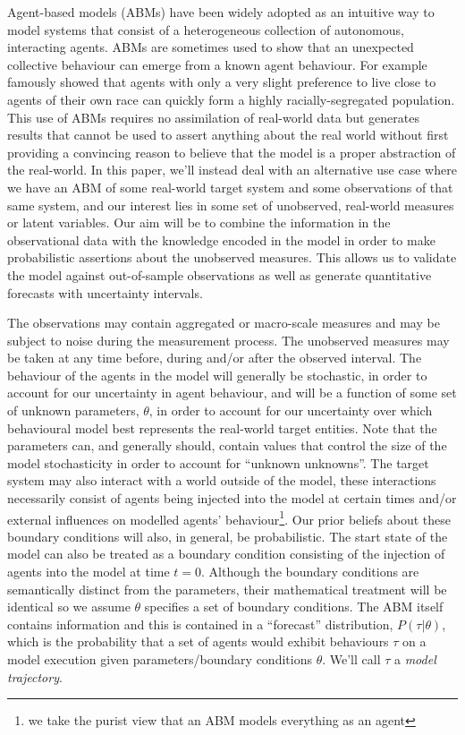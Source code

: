 \documentclass{article}
\begin{document}
Agent-based models (ABMs) have been widely adopted as an intuitive way to model systems that consist of a heterogeneous collection of autonomous, interacting agents. ABMs are sometimes used to show that an unexpected collective behaviour can emerge from a known agent behaviour.  For example \citet{schelling1971dynamic} famously showed that agents with only a very slight preference to live close to agents of their own race can quickly form a highly racially-segregated population. This use of ABMs requires no assimilation of real-world data but generates results that cannot be used to assert anything about the real world without first providing a convincing reason to believe that the model is a proper abstraction of the real-world. In this paper, we'll instead deal with an alternative use case where we have an ABM of some real-world target system and some observations of that same system, and our interest lies in some set of unobserved, real-world measures or latent variables. Our aim will be to combine the information in the observational data with the knowledge encoded in the model in order to make probabilistic assertions about the unobserved measures. This allows us to validate the model against out-of-sample observations as well as generate quantitative forecasts with uncertainty intervals.

The observations may contain aggregated or macro-scale measures and may be subject to noise during the measurement process. The unobserved measures may be taken at any time before, during and/or after the observed interval. The behaviour of the agents in the model will generally be stochastic, in order to account for our uncertainty in agent behaviour, and will be a function of some set of unknown parameters, $\theta$, in order to account for our uncertainty over which behavioural model best represents the real-world target entities. Note that the parameters can, and generally should, contain values that control the size of the model stochasticity in order to account for ``unknown unknowns''. The target system may also interact with a world outside of the model, these interactions necessarily consist of agents being injected into the model at certain times and/or external influences on modelled agents' behaviour\footnote{we take the purist view that an ABM models everything as an agent}. Our prior beliefs about these boundary conditions will also, in general, be probabilistic. The start state of the model can also be treated as a boundary condition consisting of the injection of agents into the model at time $t=0$. Although the boundary conditions are semantically distinct from the parameters, their mathematical treatment will be identical so we assume $\theta$ specifies a set of boundary conditions. The ABM itself contains information and this is contained in a ``forecast'' distribution, $P(\tau| \theta)$, which is the probability that a set of agents would exhibit behaviours $\tau$ on a model execution given parameters/boundary conditions $\theta$. We'll call $\tau$ a \textit{model trajectory}.
\end{document}
